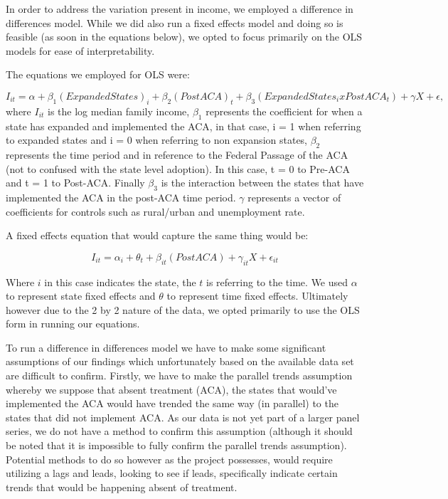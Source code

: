 \documentclass[12pt, ]{article}
\begin{document}
In order to address the variation present in income, we employed a
difference in differences model. While we did also run a fixed effects
model and doing so is feasible (as soon in the equations below), we
opted to focus primarily on the OLS models for ease of interpretability.

The equations we employed for OLS were:

\[I_{it} = \alpha + \beta_{1}(ExpandedStates)_i + \beta_{2}(PostACA)_t + \beta_{3}(ExpandedStates_i x PostACA_t) + \gamma X + \epsilon,\]
where \(I_{it}\) is the log median family income, \(\beta_1\) represents
the coefficient for when a state has expanded and implemented the ACA,
in that case, i = 1 when referring to expanded states and i = 0 when
referring to non expansion states, \(\beta_2\) represents the time
period and in reference to the Federal Passage of the ACA (not to
confused with the state level adoption). In this case, t = 0 to Pre-ACA
and t = 1 to Post-ACA. Finally \(\beta_3\) is the interaction between
the states that have implemented the ACA in the post-ACA time period.
\(\gamma\) represents a vector of coefficients for controls such as
rural/urban and unemployment rate.

A fixed effects equation that would capture the same thing would be:

\[
I_{it} = \alpha_i + \theta_t + \beta_{it}(PostACA) + \gamma_{it}X + \epsilon_{it}
\]

Where \(i\) in this case indicates the state, the \(t\) is referring to
the time. We used \(\alpha\) to represent state fixed effects and
\(\theta\) to represent time fixed effects. Ultimately however due to
the 2 by 2 nature of the data, we opted primarily to use the OLS form in
running our equations.

To run a difference in differences model we have to make some
significant assumptions of our findings which unfortunately based on the
available data set are difficult to confirm. Firstly, we have to make
the parallel trends assumption whereby we suppose that absent treatment
(ACA), the states that would've implemented the ACA would have trended
the same way (in parallel) to the states that did not implement ACA. As
our data is not yet part of a larger panel series, we do not have a
method to confirm this assumption (although it should be noted that it
is impossible to fully confirm the parallel trends assumption).
Potential methods to do so however as the project possesses, would
require utilizing a lags and leads, looking to see if leads,
specifically indicate certain trends that would be happening absent of
treatment.
\end{document}
